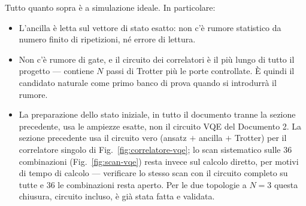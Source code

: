 \documentclass[11pt,a4paper]{article}
\begin{document}
Tutto quanto sopra è a simulazione ideale. In particolare:

\begin{itemize}[leftmargin=1.5em,itemsep=2pt]
\item L'ancilla è letta sul vettore di stato esatto: non c'è rumore statistico
da numero finito di ripetizioni, né errore di lettura.
\item Non c'è rumore di gate, e il circuito dei correlatori è il più lungo di
tutto il progetto --- contiene $N$ passi di Trotter più le porte controllate.
È quindi il candidato naturale come primo banco di prova quando si introdurrà
il rumore.
\item La preparazione dello stato iniziale, in tutto il documento tranne la
sezione precedente, usa le ampiezze esatte, non il circuito VQE del
Documento 2. La sezione precedente usa il circuito vero (ansatz $+$ ancilla
$+$ Trotter) per il correlatore singolo di
Fig.~\ref{fig:correlatore-vqe}; lo scan sistematico sulle $36$ combinazioni
(Fig.~\ref{fig:scan-vqe}) resta invece sul calcolo diretto, per motivi di
tempo di calcolo --- verificare lo stesso scan con il circuito completo su
tutte e $36$ le combinazioni resta aperto. Per le due topologie a $N=3$
questa chiusura, circuito incluso, è già stata fatta e validata.
\end{itemize}
\end{document}
